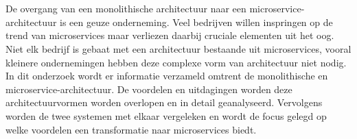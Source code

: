 
%
%

%



\chapter*{}

De overgang van een monolithische architectuur naar een microservice-architectuur is een geuze onderneming. Veel bedrijven willen inspringen op de trend van microservices maar verliezen daarbij cruciale elementen uit het oog. Niet elk bedrijf is gebaat met een architectuur bestaande uit microservices, vooral kleinere ondernemingen hebben deze complexe vorm van architectuur niet nodig.
In dit onderzoek wordt er informatie verzameld omtrent de monolithische en microservice-architectuur. De voordelen en uitdagingen worden deze architectuurvormen worden overlopen en in detail geanalyseerd. Vervolgens worden de twee systemen met elkaar vergeleken en wordt de focus gelegd op welke voordelen een transformatie naar microservices biedt. 


